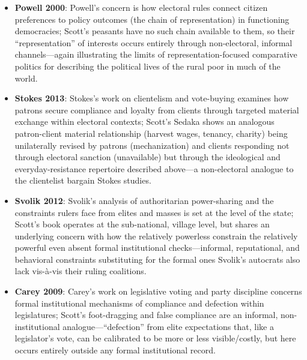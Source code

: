 \documentclass[12pt]{article}
\begin{document}
\begin{itemize}[leftmargin=*, itemsep=4pt]
    \item \textbf{Powell 2000}: Powell's concern is how electoral rules connect citizen preferences to policy outcomes (the chain of representation) in functioning democracies; Scott's peasants have no such chain available to them, so their ``representation'' of interests occurs entirely through non-electoral, informal channels---again illustrating the limits of representation-focused comparative politics for describing the political lives of the rural poor in much of the world.
    \item \textbf{Stokes 2013}: Stokes's work on clientelism and vote-buying examines how patrons secure compliance and loyalty from clients through targeted material exchange within electoral contexts; Scott's Sedaka shows an analogous patron-client material relationship (harvest wages, tenancy, charity) being unilaterally revised by patrons (mechanization) and clients responding not through electoral sanction (unavailable) but through the ideological and everyday-resistance repertoire described above---a non-electoral analogue to the clientelist bargain Stokes studies.
    \item \textbf{Svolik 2012}: Svolik's analysis of authoritarian power-sharing and the constraints rulers face from elites and masses is set at the level of the state; Scott's book operates at the sub-national, village level, but shares an underlying concern with how the relatively powerless constrain the relatively powerful even absent formal institutional checks---informal, reputational, and behavioral constraints substituting for the formal ones Svolik's autocrats also lack vis-à-vis their ruling coalitions.
    \item \textbf{Carey 2009}: Carey's work on legislative voting and party discipline concerns formal institutional mechanisms of compliance and defection within legislatures; Scott's foot-dragging and false compliance are an informal, non-institutional analogue---``defection'' from elite expectations that, like a legislator's vote, can be calibrated to be more or less visible/costly, but here occurs entirely outside any formal institutional record.

\end{itemize}
\end{document}

